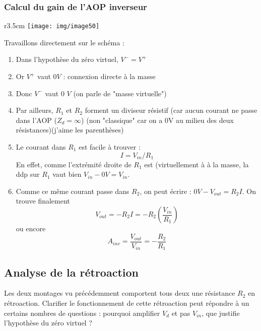 \subsubsection{Calcul du gain de l'AOP inverseur}
\begin{wrapfigure}[8]{r}{3.5cm}
	\texttt{[image: img/image50]}
\end{wrapfigure}
Travaillons directement sur le schéma :
\begin{enumerate}
	\item Dans l'hypothèse du zéro virtuel, $V^- = V^+$
	\item Or $V^+$ vaut $0V$ : connexion directe à la masse
	\item Donc $V^-$ vaut 0 $V$ (on parle de "masse virtuelle")
	\item Par ailleurs, $R_1$ et $R_2$ forment un diviseur résistif (car aucun courant ne passe dans l'AOP ($Z_d = \infty$) (non "classique" car on a 0V au milieu des deux résistances)(j'aime les parenthèses)
	\item Le courant dans $R_1$ est facile à trouver :
	      \begin{equation}
	      	I = V_{in}/R_1
	      \end{equation}
	      En effet, comme l'extrémité droite de $R_1$ est (virtuellement à à la masse, la ddp sur $R_1$ vaut bien $V_{in}-0V = V_{in}$.
	\item Comme ce même courant passe dans $R_2$, on peut écrire : $0V-V_{out} = R_2I$. On trouve finalement
	      \begin{equation}
	      	V_{out} = -R_2I = -R_2\left(\frac{V_{in}}{R_1}\right)
	      \end{equation}
	      ou encore
	      \begin{equation}
	      	A_{inv} = \frac{V_{out}}{V_{in}} = - \frac{R_2}{R_1}
	      \end{equation}
\end{enumerate}


	\subsection{Analyse de la rétroaction}
	Les deux montages vu précédemment comportent tous deux une résistance $R_2$ 
	en rétroaction. Clarifier le fonctionnement de cette rétroaction peut 
	répondre à un certains nombres de questions : pourquoi amplifier $V_d$ et 
	pas $V_{in}$, que justifie l'hypothèse du zéro virtuel ?
	
